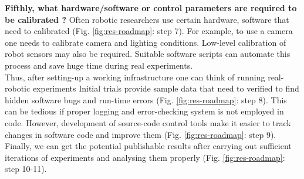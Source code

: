 \textbf{Fifthly, what hardware/software or control parameters are required to be calibrated ?}  Often robotic researchers use 
certain hardware, software that need to calibrated (Fig. \ref{fig:res-roadmap}: step 7). For example, to use a camera one needs to calibrate camera and lighting conditions. Low-level calibration of robot sensors may also be required. Suitable software scripts  can automate this process and save huge time during real experiments.\\
Thus, after setting-up  a working infrastructure one can think of running real-robotic experiments  Initial trials provide sample data that need to verified to find hidden software bugs and run-time errors (Fig. \ref{fig:res-roadmap}: step 8). This can be tedious if proper logging and error-checking system is not employed in code. However, development of source-code control tools make it easier to track changes in software code and improve them (Fig. \ref{fig:res-roadmap}: step 9). Finally, we can get the potential publishable  results after carrying out sufficient iterations of experiments and analysing them properly (Fig. \ref{fig:res-roadmap}: step 10-11).
